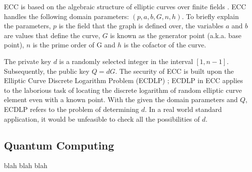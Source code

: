 ECC is based on the algebraic structure of elliptic curves over finite fields \cite{RSA_ECC}. ECC handles the following domain parameters: \((p,a,b,G,n,h)\). To briefly explain the parameters, \(p\) is the field that the graph is defined over, the variables \(a\) and \(b\) are values that define the curve, \(G\) is known as the generator point (a.k.a. base point), \(n\) is the prime order of G and \(h\) is the cofactor of the curve.

The private key \(d\) is a randomly selected integer in the interval \( [ 1 , n - 1 ]\). Subsequently, the public key \(Q=dG\). The security of ECC is built upon the Elliptic Curve Discrete Logarithm Problem (ECDLP) \cite{RSA_ECC}; ECDLP in ECC applies to the laborious task of locating the discrete logarithm of random elliptic curve element even with a known point. With the given the domain parameters and \(Q\), ECDLP refers to the problem of determining \(d\). In a real world standard application, it would be unfeasible to check all the possibilities of \(d\).

\subsection{Quantum Computing}
blah blah blah